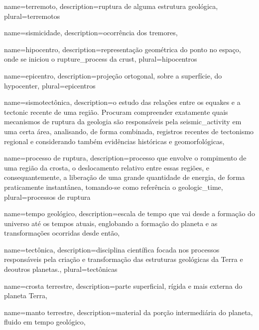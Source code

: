 {
	name={terremoto},
	description={ruptura de alguma estrutura geológica},
	plural={terremotos}
}

{
	name={sismicidade},
	description={ocorrência dos tremores},
}

{
	name={hipocentro},
	description={representação geométrica do ponto no espaço, onde 
		se iniciou o \gls{rupture_process} da \gls{crust}},
	plural={hipocentros}
}

{
	name={epicentro},
	description={projeção ortogonal, sobre a superfície, do \gls{hypocenter}},
	plural={epicentros}
}


{
	name={sismotectônica},
	description={o estudo das relações entre os \glspl{equake} e a \gls{tectonic} recente de uma região.
				 Procuram compreender exatamente quais mecanismos de ruptura da geologia são responsáveis pela \gls{seismic_activity}
				 em uma certa área, analisando, de forma combinada, registros recentes de tectonismo regional e considerando também
				 evidências históricas e geomorfológicas},
}


{
	name={processo de ruptura},
	description={processo que envolve o rompimento de uma região da crosta,
			o deslocamento relativo entre essas regiões, e consequantemente,
			a liberação de uma grande quantidade de energia, de forma praticamente
			instantânea, tomando-se como referência o \gls{geologic_time}},
	plural={processos de ruptura}
}


{
	name={tempo geológico},
	description={escala de tempo que vai desde a formação do universo até os tempos atuais,
				englobando a formação do planeta e as transformações ocorridas desde então},
}


{
	name={tect\^onica},
	description={disciplina científica focada nos processos respons\'aveis 
				 pela cria\c{c}\~ao e transforma\c{c}\~ao das estruturas geológicas da Terra e deoutros planetas.},
	plural={tect\^onicas}
}


{
	name={crosta terrestre},
	description={parte superficial, rígida e mais externa do planeta Terra},
}

{
	name={manto terrestre},
	description={material da por{ç}{ã}o intermediária do planeta, 
		fluido em tempo geológico},
}

